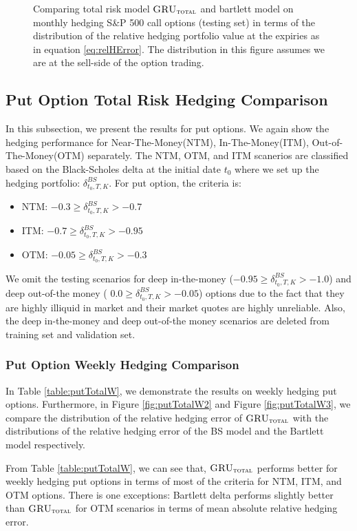 \documentclass[letterpaper,12pt,titlepage,oneside,final]{book}
\numberwithin{equation}{section}
\theoremstyle{definition}
\newcommand{\modelT}{\textsc{GRU}_{\textsc{total}}}
\begin{document}
\begin{figure}[htp!]
	\caption{Comparing total risk model $\modelT$ and bartlett model on monthly hedging S\&P 500 call options (testing set) in terms of the distribution of the  relative hedging portfolio value at the expiries as in equation \eqref{eq:relHError}. The distribution in this figure assumes we are at the sell-side of the option trading.} \label{fig:CallTotalM3}
\end{figure}

\newpage
\subsection{Put Option Total Risk Hedging Comparison}

In this subsection, we present the results for put options. We again show the hedging performance for Near-The-Money(NTM), In-The-Money(ITM), Out-of-The-Money(OTM) separately.  The NTM, OTM, and ITM scanerios are classified based on the Black-Scholes delta at the initial date $t_0$ where we set up the hedging portfolio: $\delta^{BS}_{t_0,T,K}$. For put option, the criteria is:
\begin{itemize}
	\item  NTM: $-0.3 \geq \delta^{BS}_{t_0,T,K} >-0.7$
	\item ITM: $-0.7 \geq \delta^{BS}_{t_0,T,K} >-0.95$
	\item  OTM: $-0.05 \geq \delta^{BS}_{t_0,T,K} >-0.3$
\end{itemize}
We omit the testing scenarios for deep in-the-money ($-0.95 \geq \delta^{BS}_{t_0,T,K} >-1.0$) and deep out-of-the money ( $0.0 \geq \delta^{BS}_{t_0,T,K} >-0.05$) options due to the fact that they are highly illiquid in market and their market quotes are highly unreliable. Also, the deep in-the-money and deep out-of-the money scenarios are deleted from training set and validation set.
\subsubsection{Put Option Weekly Hedging Comparison}
In Table \ref{table:putTotalW}, we demonstrate the results on weekly hedging put options. Furthermore, in Figure \ref{fig:putTotalW2} and  Figure \ref{fig:putTotalW3}, we compare the distribution of the relative hedging error of $\modelT$ with the distributions of the relative hedging error of the BS model and the Bartlett model respectively.

From Table \ref{table:putTotalW}, we can see that, $\modelT$  performs better for weekly hedging put options in terms of most of the criteria for NTM, ITM, and OTM options.  There  is one  exceptions: Bartlett delta performs  slightly better than $\modelT$ for OTM scenarios in terms of mean absolute relative hedging error. 
\end{document}
